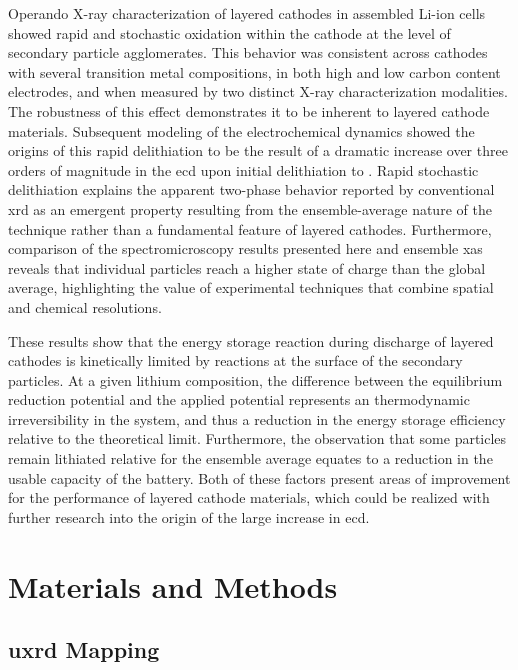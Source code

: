 \documentclass{article}
\begin{document}
Operando X-ray characterization of layered cathodes in assembled
Li-ion cells showed rapid and stochastic oxidation within the cathode
at the level of secondary particle agglomerates. This behavior was
consistent across cathodes with several transition metal compositions,
in both high and low carbon content electrodes, and when measured by
two distinct X-ray characterization modalities. The robustness of this
effect demonstrates it to be inherent to layered cathode
materials. Subsequent modeling of the electrochemical dynamics showed
the origins of this rapid delithiation to be the result of a dramatic
increase over three orders of magnitude in the \gls{ecd} upon initial
delithiation to . Rapid stochastic delithiation explains the
apparent two-phase behavior reported by conventional \gls{xrd} as an
emergent property resulting from the ensemble-average nature of the
technique rather than a fundamental feature of layered
cathodes. Furthermore, comparison of the spectromicroscopy results
presented here and ensemble \gls{xas} reveals that individual
particles reach a higher state of charge than the global average,
highlighting the value of experimental techniques that combine spatial
and chemical resolutions.

These results show that the energy storage reaction during discharge
of layered cathodes is kinetically limited by reactions at the surface
of the secondary particles. At a given lithium composition, the
difference between the equilibrium reduction potential and the applied
potential represents an thermodynamic irreversibility in the system,
and thus a reduction in the energy storage efficiency relative to the
theoretical limit. Furthermore, the observation that some particles
remain lithiated relative for the ensemble average equates to a
reduction in the usable capacity of the battery. Both of these factors
present areas of improvement for the performance of layered cathode
materials, which could be realized with further research into the
origin of the large increase in \gls{ecd}.

\section*{Materials and Methods}

\subsection*{\gls{uxrd} Mapping}
\end{document}
